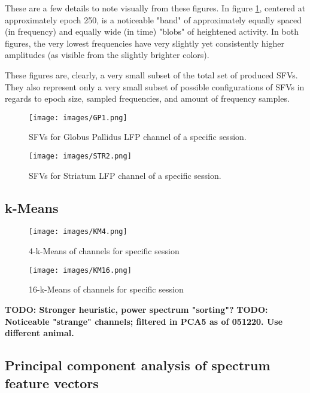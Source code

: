 \documentclass{article}
\begin{document}
These are a few details to note visually from these figures. In figure \ref{fig:GP1}, centered at approximately epoch 250, is a noticeable "band" of approximately equally spaced (in frequency) and equally wide (in time) "blobs" of heightened activity. In both figures, the very lowest frequencies have very slightly yet consistently higher amplitudes (as visible from the slightly brighter colors).

These figures are, clearly, a very small subset of the total set of produced SFVs. They also represent only a very small subset of possible configurations of SFVs in regards to epoch size, sampled frequencies, and amount of frequency samples.

\begin{figure}
    \centering
    \centerline{\texttt{[image: images/GP1.png]}}
    \caption{SFVs for Globus Pallidus LFP channel of a specific session.}
    \label{fig:GP1}
\end{figure}

\begin{figure}
    \centering
    \centerline{\texttt{[image: images/STR2.png]}}
    \caption{SFVs for Striatum LFP channel of a specific session.}
    \label{fig:STR2}
\end{figure}

\subsection{k-Means}

\begin{figure}
    \centering
    \centerline{\texttt{[image: images/KM4.png]}}
    \caption{4-k-Means of channels for specific session}
    \label{fig:KM4}
\end{figure}

\begin{figure}
    \centering
    \centerline{\texttt{[image: images/KM16.png]}}
    \caption{16-k-Means of channels for specific session}
    \label{fig:KM16}
\end{figure}

\textbf{TODO: Stronger heuristic, power spectrum "sorting"?}
\textbf{TODO: Noticeable "strange" channels; filtered in PCA5 as of 051220. Use different animal.}

\subsection{Principal component analysis of spectrum feature vectors}
\end{document}
